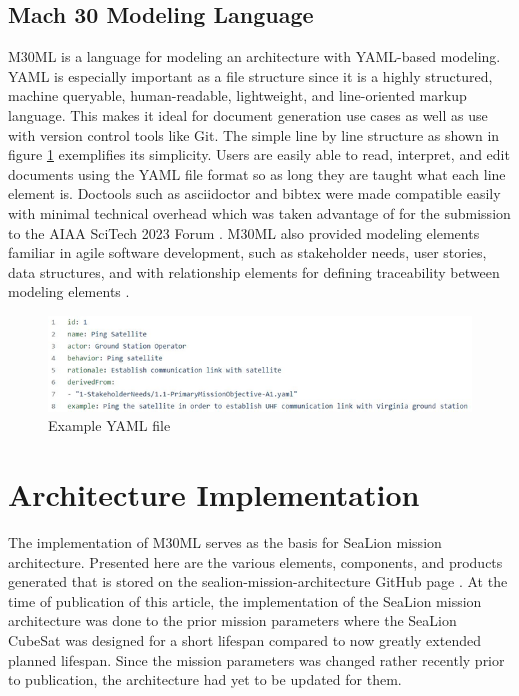\documentclass[journal,article,submit,pdftex,moreauthors]{Definitions/mdpi}
\begin{document}
\subsection{Mach 30 Modeling Language}

M30ML is a language for modeling an architecture with YAML-based modeling.  YAML is especially important as a file structure since it is a highly structured, machine queryable, human-readable, lightweight, and line-oriented markup language.  This makes it ideal for document generation use cases as well as use with version control tools like Git.  The simple line by line structure as shown in figure \ref{fig:example_yaml} exemplifies its simplicity.  Users are easily able to read, interpret, and edit documents using the YAML file format so as long they are taught what each line element is.  Doctools such as asciidoctor and bibtex were made compatible easily with minimal technical overhead which was taken advantage of for the submission to the AIAA SciTech 2023 Forum \cite{scitech_proceeding}.  M30ML also provided modeling elements familiar in agile software development, such as stakeholder needs, user stories, data structures, and with relationship elements for defining traceability between modeling elements \cite{mach30_git}.

\begin{figure}[H]
    \includegraphics[width=12 cm]{assets/user_story.png}
    \caption{Example YAML file}
	\label{fig:example_yaml}
    \end{figure}   
\unskip

\section{Architecture Implementation}
The implementation of M30ML serves as the basis for SeaLion mission architecture.  Presented here are the various elements, components, and products generated that is stored on the sealion-mission-architecture GitHub page \cite{sealion_mission_architecture}.  At the time of publication of this article, the implementation of the SeaLion mission architecture was done to the prior mission parameters where the SeaLion CubeSat was designed for a short lifespan compared to now greatly extended planned lifespan.  Since the mission parameters was changed rather recently prior to publication, the architecture had yet to be updated for them.
\end{document}
